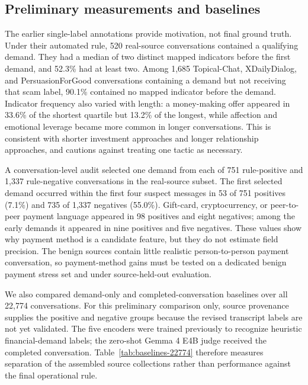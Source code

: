 \documentclass[letterpaper,11pt]{article}
\begin{document}
\subsection{Preliminary measurements and baselines}
The earlier single-label annotations provide motivation, not final ground truth.
Under their automated rule, 520 real-source conversations contained a qualifying
demand. They had a median of two distinct mapped indicators before the first
demand, and 52.3\% had at least two. Among 1,685 Topical-Chat, XDailyDialog, and
PersuasionForGood conversations containing a demand but not receiving that scam
label, 90.1\% contained no mapped indicator before the demand. Indicator frequency
also varied with length: a money-making offer appeared in 33.6\% of the shortest
quartile but 13.2\% of the longest, while affection and emotional leverage became
more common in longer conversations. This is consistent with shorter investment
approaches and longer relationship approaches, and cautions against treating one
tactic as necessary.

A conversation-level audit selected one demand from each of 751 rule-positive and
1,337 rule-negative conversations in the real-source subset. The first selected
demand occurred within the first four suspect messages in 53 of 751 positives
(7.1\%) and 735 of 1,337 negatives (55.0\%). Gift-card, cryptocurrency, or
peer-to-peer payment language appeared in 98 positives and eight negatives; among
the early demands it appeared in nine positives and five negatives. These values
show why payment method is a candidate feature, but they do not estimate field
precision. The benign sources contain little realistic person-to-person payment
conversation, so payment-method gains must be tested on a dedicated benign payment
stress set and under source-held-out evaluation.

We also compared demand-only and completed-conversation baselines over all 22,774
conversations. For this preliminary comparison only, source provenance supplies
the positive and negative groups because the revised transcript labels are not
yet validated. The five encoders were trained previously to recognize heuristic
financial-demand labels; the zero-shot Gemma 4 E4B judge received the completed
conversation. Table~\ref{tab:baselines-22774} therefore measures separation of
the assembled source collections rather than performance against the final
operational rule.
\end{document}
